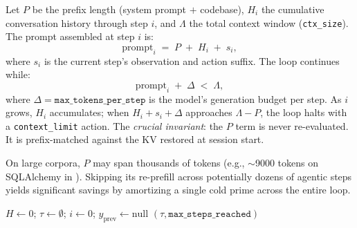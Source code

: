 \documentclass[10pt]{article}
\begin{document}
Let $P$ be the prefix length (system prompt $+$ codebase), $H_i$ the cumulative
conversation history through step $i$, and $\Lambda$ the total context window
(\texttt{ctx\_size}). The prompt assembled at step $i$ is:
\begin{equation}
\text{prompt}_i \;=\; P \;+\; H_i \;+\; s_i,
\label{eq:sliding-prompt}
\end{equation}
where $s_i$ is the current step's observation and action suffix. The loop
continues while:
\begin{equation}
\text{prompt}_i \;+\; \Delta \;<\; \Lambda,
\label{eq:window-check}
\end{equation}
where $\Delta = \texttt{max\_tokens\_per\_step}$ is the model's generation budget
per step. As $i$ grows, $H_i$ accumulates; when $H_i + s_i + \Delta$ approaches
$\Lambda - P$, the loop halts with a \texttt{context\_limit} action. The
\emph{crucial invariant}: the $P$ term is never re-evaluated. It is
prefix-matched against the KV restored at session start.

On large corpora, $P$ may span thousands of tokens (e.g., $\sim$\SI{9000}{}
tokens on SQLAlchemy in ). Skipping its re-prefill across
potentially dozens of agentic steps yields significant savings by amortizing a
single cold prime across the entire loop.

\begin{algorithm}[t]
\footnotesize
\DontPrintSemicolon
\caption{Multi-step agentic loop with sliding-window context management}
\label{alg:window}
$H \leftarrow 0$; $\tau \leftarrow \emptyset$; $i \leftarrow 0$; $y_{\text{prev}} \leftarrow \text{null}$\;
\Return $(\tau, \texttt{max\_steps\_reached})$\;
\end{algorithm}
\end{document}
